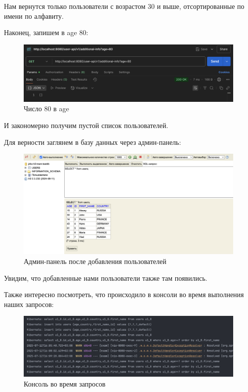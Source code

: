 \documentclass[a4paper, 14pt]{article}
\begin{document}
Нам вернутся только пользователи с возрастом 30 и выше, отсортированные по имени по алфавиту.

Наконец, запишем в age 80:

\begin{figure}[H]
	\centering
	\includegraphics[width=15cm]{resources/13.png}
	\caption{Число 80 в age}
\end{figure}

И закономерно получим пустой список пользователей.

Для верности заглянем в базу данных через админ-панель:

\begin{figure}[H]
	\centering
	\includegraphics[width=15cm]{resources/14.png}
	\caption{Админ-панель после добавления пользователей}
\end{figure}

Увидим, что добавленные нами пользователи также там появились.

Также интересно посмотреть, что происходило в консоли во время выполнения наших запросов:

\begin{figure}[H]
	\centering
	\includegraphics[width=15cm]{resources/15.png}
	\caption{Консоль во время запросов}
\end{figure}
\end{document}
